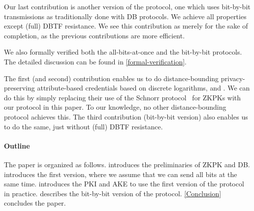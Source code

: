 Our last contribution is another version of the protocol, one which uses 
bit-by-bit transmissions as traditionally done with \ac{DB} protocols.
We achieve all properties except (full) \ac{DBTF} resistance.
We see this contribution as merely for the sake of completion, as the previous 
contributions are more efficient.

We also formally verified both the all-bits-at-once and the bit-by-bit 
protocols.
The detailed discussion can be found in \cref{formal-verification}.

The first (and second) contribution enables us to do distance-bounding 
privacy-preserving attribute-based credentials based on discrete logarithms, 
\eg \cite{Camenisch-phdthesis} and \cite{CLsignatures}.
We can do this by simply replacing their use of the Schnorr 
protocol~\cite{Schnorr} for \acp{ZKPK} with our protocol in this paper.
To our knowledge, no other distance-bounding protocol achieves this.
The third contribution (bit-by-bit version) also enables us to do the same, 
just without (full) \ac{DBTF} resistance. %

\paragraph*{Outline}

The paper is organized as follows.
 introduces the preliminaries of \ac{ZKPK} and \ac{DB}.
 introduces the first version, where we assume that we can 
send all bits at the same time.
 introduces the \ac{PKI} and \ac{AKE} to use the first 
version of the protocol in practice.
 describes the bit-by-bit version of the protocol.
\cref{Conclusion} concludes the paper.
